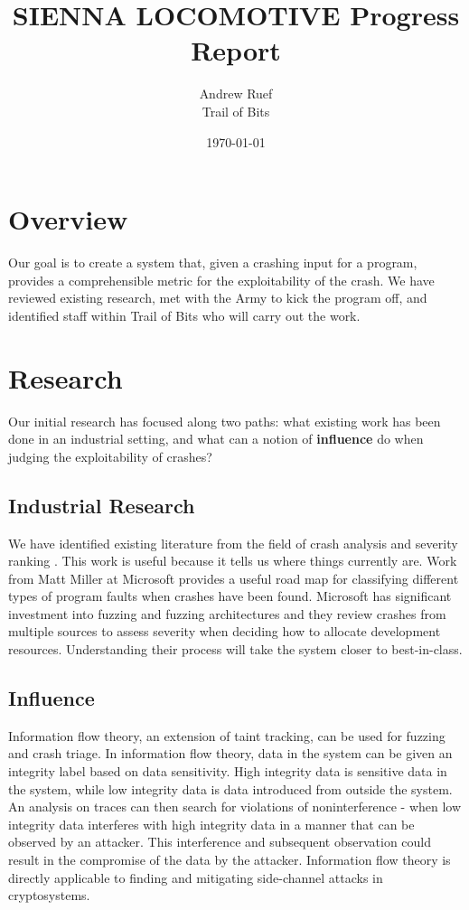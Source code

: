 \documentclass{article}
\title{SIENNA LOCOMOTIVE Progress Report}
\author{Andrew Ruef \\ Trail of Bits}
\date{\today}
\begin{document}
\maketitle 

\section{Overview}

Our goal is to create a system that, given a crashing input for a program, 
provides a comprehensible metric for the exploitability of the crash. 
We have reviewed existing research, met with the Army to kick the program 
off, and identified staff within Trail of Bits who will carry out the work.

\section{Research}

Our initial research has focused along two paths: what existing work 
has been done in an industrial setting, and what can a 
notion of \textbf{influence} do when judging the exploitability of crashes?

\subsection{Industrial Research}
We have identified existing literature from the field of crash analysis
and severity ranking \cite{skape} \cite{kratkiewicz2006taxonomy}. 
This work is useful because 
it tells us where things currently are. Work from Matt Miller at Microsoft
provides a useful road map for classifying different types of program faults
when crashes have been found. Microsoft has significant investment into 
fuzzing and fuzzing architectures and they review crashes from multiple
sources to assess severity when deciding how to allocate development 
resources. Understanding their process will take the system closer to 
best-in-class.

\subsection{Influence}
Information flow theory, an extension of taint tracking, can be used for 
fuzzing and crash triage. In information flow theory, data in the system 
can be given an integrity label based on data sensitivity. High 
integrity data is sensitive data in the system, while low integrity data 
is data introduced from outside the system. An analysis on traces can 
then search for violations of noninterference - when low integrity 
data interferes with high integrity data in a manner that can be 
observed by an attacker. This interference and subsequent observation 
could result in the compromise of the data by the attacker. Information 
flow theory is directly applicable to finding and mitigating side-channel 
attacks in cryptosystems\cite{molnar}.
\end{document}
